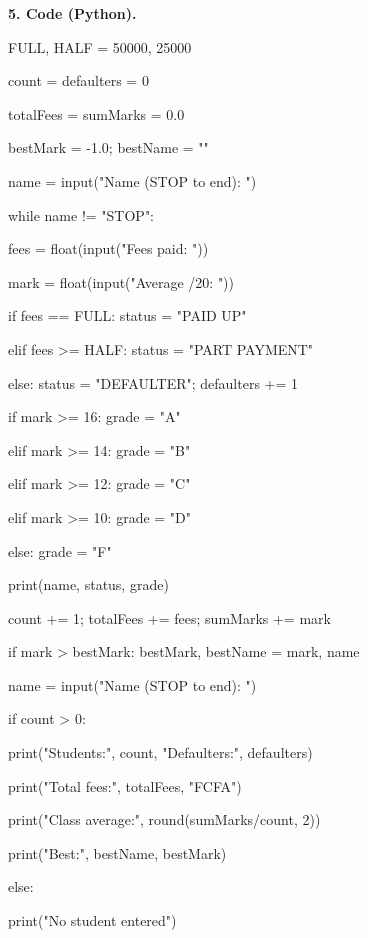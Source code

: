 \documentclass[11pt]{article}
\begin{document}
\textbf{5. Code (Python).}\par
\begin{exemplebox}
\begin{ttfamily}
FULL, HALF = 50000, 25000\par
count = defaulters = 0\par
totalFees = sumMarks = 0.0\par
bestMark = -1.0; bestName = ""\par
name = input("Name (STOP to end): ")\par
while name != "STOP":\par
\hspace*{1em}fees = float(input("Fees paid: "))\par
\hspace*{1em}mark = float(input("Average /20: "))\par
\hspace*{1em}if fees == FULL: status = "PAID UP"\par
\hspace*{1em}elif fees >= HALF: status = "PART PAYMENT"\par
\hspace*{1em}else: status = "DEFAULTER"; defaulters += 1\par
\hspace*{1em}if mark >= 16: grade = "A"\par
\hspace*{1em}elif mark >= 14: grade = "B"\par
\hspace*{1em}elif mark >= 12: grade = "C"\par
\hspace*{1em}elif mark >= 10: grade = "D"\par
\hspace*{1em}else: grade = "F"\par
\hspace*{1em}print(name, status, grade)\par
\hspace*{1em}count += 1; totalFees += fees; sumMarks += mark\par
\hspace*{1em}if mark > bestMark: bestMark, bestName = mark, name\par
\hspace*{1em}name = input("Name (STOP to end): ")\par
if count > 0:\par
\hspace*{1em}print("Students:", count, "Defaulters:", defaulters)\par
\hspace*{1em}print("Total fees:", totalFees, "FCFA")\par
\hspace*{1em}print("Class average:", round(sumMarks/count, 2))\par
\hspace*{1em}print("Best:", bestName, bestMark)\par
else:\par
\hspace*{1em}print("No student entered")
\end{ttfamily}
\end{exemplebox}
\end{document}
